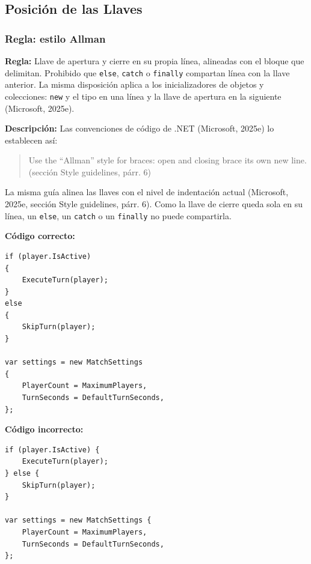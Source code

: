 \subsection{Posición de las Llaves}

\subsubsection{Regla: estilo Allman}

\textbf{Regla:} Llave de apertura y cierre en su propia línea, alineadas con el bloque que delimitan. Prohibido que \texttt{else}, \texttt{catch} o \texttt{finally} compartan línea con la llave anterior. La misma disposición aplica a los inicializadores de objetos y colecciones: \texttt{new} y el tipo en una línea y la llave de apertura en la siguiente (Microsoft, 2025e).

\textbf{Descripción:} Las convenciones de código de .NET (Microsoft, 2025e) lo establecen así:
\begin{quote}
Use the ``Allman'' style for braces: open and closing brace its own new line. (sección Style guidelines, párr. 6)
\end{quote}
\noindent La misma guía alinea las llaves con el nivel de indentación actual (Microsoft, 2025e, sección Style guidelines, párr. 6). Como la llave de cierre queda sola en su línea, un \texttt{else}, un \texttt{catch} o un \texttt{finally} no puede compartirla.

\textbf{Código correcto:}
\begin{lstlisting}[style=csharpstyle]
if (player.IsActive)
{
    ExecuteTurn(player);
}
else
{
    SkipTurn(player);
}

var settings = new MatchSettings
{
    PlayerCount = MaximumPlayers,
    TurnSeconds = DefaultTurnSeconds,
};
\end{lstlisting}

\textbf{Código incorrecto:}
\begin{lstlisting}[style=csharpstyle]
if (player.IsActive) {
    ExecuteTurn(player);
} else {
    SkipTurn(player);
}

var settings = new MatchSettings {
    PlayerCount = MaximumPlayers,
    TurnSeconds = DefaultTurnSeconds,
};
\end{lstlisting}
